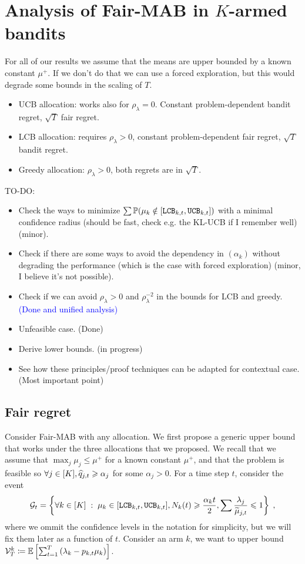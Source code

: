 \section{Analysis of Fair-MAB in $K$-armed bandits}

For all of our results we assume that the means are upper bounded by a known constant $\mu^+$. If we don't do that we can use a forced exploration, but this would degrade some bounds in the scaling of $T$.
\begin{itemize}
	\item UCB allocation: works also for $\rho_\lambda=0$. Constant problem-dependent bandit regret, $\sqrt{T}$ fair regret.	
	\item LCB allocation: requires $\rho_\lambda>0$, constant problem-dependent fair regret, $\sqrt{T}$ bandit regret.
	\item Greedy allocation: $\rho_\lambda>0$, both regrets are in $\sqrt{T}$. 
\end{itemize}

TO-DO:
\begin{itemize}
	\item Check the ways to minimize $\sum \mathbb{P}(\mu_k \notin [\texttt{LCB}_{k,t}, \texttt{UCB}_{k, t}])$ with a minimal confidence radius (should be fast, check e.g. the KL-UCB if I remember well) (minor).
	\item Check if there are some ways to avoid the dependency in $(\alpha_k)$ without degrading the performance (which is the case with forced exploration) (minor, I believe it's not possible).
	\item Check if we can avoid $\rho_\lambda>0$ and $\rho_\lambda^{-2}$ in the bounds for LCB and greedy. \textcolor{blue}{(Done and unified analysis)}
	\item Unfeasible case. (Done)
	\item Derive lower bounds. (in progress)
	\item See how these principles/proof techniques can be adapted for contextual case. (Most important point)
\end{itemize}


\subsection{Fair regret}

Consider Fair-MAB with any allocation. We first propose a generic upper bound that works under the three allocations that we proposed. We recall that we assume that $\max_j \mu_j \leq \mu^+$ for a known constant $\mu^+$, and that the problem is feasible so $\forall j \in [K], \widehat{q}_{j,t}  \geqslant \alpha_j$ for some $\alpha_j>0$. For a time step $t$, consider the event \[\mathcal{G}_t=\left\{ \forall k \in [K]\;:\; \mu_k \in [\texttt{LCB}_{k, t}, \texttt{UCB}_{k, t}], N_k(t)\geqslant \frac{\alpha_kt}{2}, \sum\frac{\lambda_j}{\widetilde{\mu}_{j,t}} \leqslant 1 \right\}\;,\]
 where we ommit the confidence levels in the notation for simplicity, but we will fix them later as a function of $t$. Consider an arm $k$, we want to upper bound $\mathcal{V}_T^k \coloneqq \mathbb{E}\left[\sum_{t=1}^T \left(\lambda_k-p_{k,t} \mu_k \right)\right]$.
 
